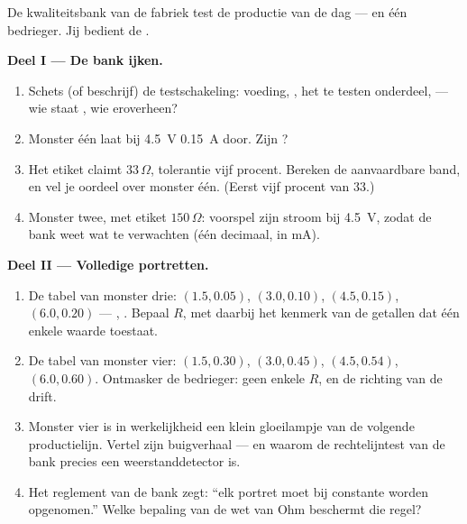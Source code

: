 \begin{problem}\label{pb:g8:ohms-law:1}
De kwaliteitsbank van de fabriek test de productie van de dag --- en
één bedrieger. Jij bedient de .

\medskip\noindent\textbf{Deel I --- De bank ijken.}
\begin{enumerate}
  \item Schets (of beschrijf) de testschakeling: voeding,
        , het te testen onderdeel,
         --- wie staat , wie
        eroverheen?
  \item Monster één laat bij \qty{4.5}{V} \qty{0.15}{A} door. Zijn
        ?
  \item Het etiket claimt $33\,\Omega$, tolerantie vijf procent.
        Bereken de aanvaardbare band, en vel je oordeel over monster
        één. (Eerst vijf procent van $33$.)
  \item Monster twee, met etiket $150\,\Omega$: voorspel zijn stroom
        bij \qty{4.5}{V}, zodat de bank weet wat te verwachten (één
        decimaal, in \unit{mA}).
\end{enumerate}

\medskip\noindent\textbf{Deel II --- Volledige portretten.}
\begin{enumerate}[resume]
  \item De tabel van monster drie: $(1.5, 0.05)$, $(3.0, 0.10)$,
        $(4.5, 0.15)$, $(6.0, 0.20)$ --- ,
        . Bepaal $R$, met daarbij het kenmerk van de
        getallen dat één enkele waarde toestaat.
  \item De tabel van monster vier: $(1.5, 0.30)$, $(3.0, 0.45)$,
        $(4.5, 0.54)$, $(6.0, 0.60)$. Ontmasker de bedrieger: geen
        enkele $R$, en de richting van de drift.
  \item Monster vier is in werkelijkheid een klein gloeilampje van de
        volgende productielijn. Vertel zijn buigverhaal --- en waarom
        de rechtelijntest van de bank precies een weerstanddetector
        is.
  \item Het reglement van de bank zegt: ``elk portret moet bij
        constante  worden opgenomen.'' Welke
        bepaling van de wet van Ohm beschermt die regel?
\end{enumerate}


\end{problem}
